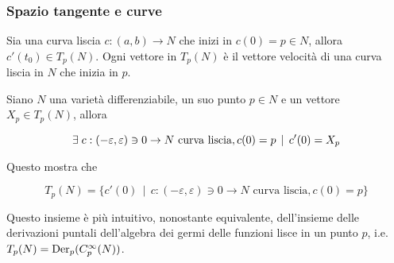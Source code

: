 \subsubsection{Spazio tangente e curve}

Sia una curva liscia $ c : (a,b) \to N $ che inizi in $ c(0) = p \in N $, allora $ c'(t_{0}) \in T_{p}(N) $. Ogni vettore in $ T_{p}(N) $ è il vettore velocità di una curva liscia in $ N $ che inizia in $ p $.

\begin{definition}
	Siano $ N $ una varietà differenziabile, un suo punto $ p \in N $ e un vettore $ X_{p} \in T_{p}(N) $, allora
	
	\begin{equation}
		\exists \; c : (-\varepsilon,\varepsilon) \ni 0 \to N \text{ curva liscia}, c(0) = p \, \mid \, c'(0) = X_{p}
	\end{equation}

	Questo mostra che
	
	\begin{equation}
		T_{p}(N) = \{ c'(0) \, \mid \, c : (-\varepsilon,\varepsilon) \ni 0 \to N \text{ curva liscia}, c(0) = p \}
	\end{equation}

	Questo insieme è più intuitivo, nonostante equivalente, dell'insieme delle derivazioni puntali dell'algebra dei germi delle funzioni lisce in un punto $ p $, i.e. $ T_{p}(N) = \operatorname{Der}_{p}(C_{p}^{\infty}(N)) $.
\end{definition}

